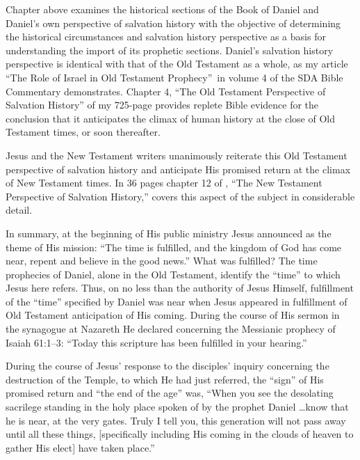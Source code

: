 Chapter  above examines the historical sections of the Book of Daniel and
Daniel's own perspective of salvation history with the objective of
determining the historical circumstances and salvation history perspective
as a basis for understanding the import of its prophetic sections. Daniel's
salvation history perspective is identical with that of the Old Testament as
a whole, as my article ``The Role of Israel in Old Testament 
Prophecy''\noteXXXV~in
volume 4 of the SDA Bible Commentary demonstrates. Chapter 4, ``The Old Testament
Perspective of Salvation History'' of my 725-page 
provides replete Bible evidence for the
conclusion that it anticipates the climax of human history at the close of
Old Testament times, or soon thereafter.

Jesus and the New Testament writers unanimously reiterate this Old Testament
perspective of salvation history and anticipate His promised return at the
climax of New Testament times. In 36 pages chapter 12 of ,
``The New Testament Perspective of Salvation History,'' covers this
aspect of the subject in considerable detail.

In summary, at the beginning of His public ministry Jesus announced as the
theme of His mission: ``The time is fulfilled, and the kingdom of God has
come near, repent and believe in the good news.'' What was fulfilled? The
time prophecies of Daniel, alone in the Old Testament, identify the ``time''
to which Jesus here refers. Thus, on no less than the authority of Jesus
Himself, fulfillment of the ``time'' specified by Daniel was near when Jesus
appeared in fulfillment of Old Testament anticipation of His coming. During
the course of His sermon in the synagogue at Nazareth He declared concerning
the Messianic prophecy of Isaiah 61:1--3: ``Today this scripture has been
fulfilled in your hearing.''

During the course of Jesus' response to the disciples' inquiry concerning
the destruction of the Temple, to which He had just referred, the ``sign'' of
His promised return and ``the end of the age'' was, ``When you see the
desolating sacrilege standing in the holy place spoken of by the prophet
Daniel \ldots know that he is near, at the very gates. Truly I tell you, this
generation will not pass away until all these things, [specifically
including His coming in the clouds of heaven to gather His elect] have taken
place.''

